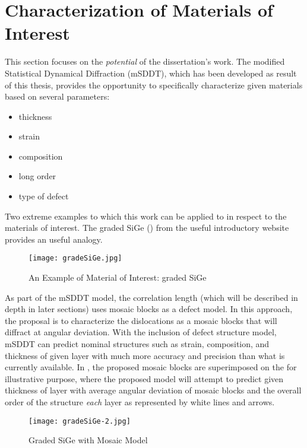 \section{Characterization of Materials of Interest}

This section focuses on the \emph{potential} of the dissertation's work.  The modified Statistical Dynamical Diffraction (mSDDT), which has been developed as result of this thesis, provides the opportunity to specifically characterize given materials based on several parameters:

{\SingleSpacing
\begin{itemize}
\item{thickness}
\item{strain}
\item{composition}
\item{long order}
\item{type of defect}
\end{itemize}}
 
Two extreme examples to which this work can be applied to in respect to the materials of interest.  The graded SiGe () from the useful introductory website \cite{Fig2-2} provides an useful analogy.  

\begin{figure}[h]
\caption{An Example of Material of Interest: graded SiGe}
\label{gradeSiGe}
\centering
\texttt{[image: gradeSiGe.jpg]}
\end{figure}

As part of the mSDDT model, the correlation length (which will be described in depth in later sections) uses mosaic blocks as a defect model.  In this approach, the proposal is to characterize the dislocations as a mosaic blocks that will diffract  at angular deviation.  With the inclusion of defect structure model, mSDDT can predict nominal structures such as strain, composition, and thickness of given layer with much more accuracy and precision than what is currently available.  In , the proposed mosaic blocks are superimposed on the  for illustrative purpose, where the proposed model will attempt to predict given thickness of layer with average angular deviation of mosaic blocks and the overall order of the structure \emph{each} layer as represented by white lines and arrows.

\begin{figure}[h]
\caption{Graded SiGe with Mosaic Model}
\label{gradeSiGe2}
\centering
\texttt{[image: gradeSiGe-2.jpg]}
\end{figure}


